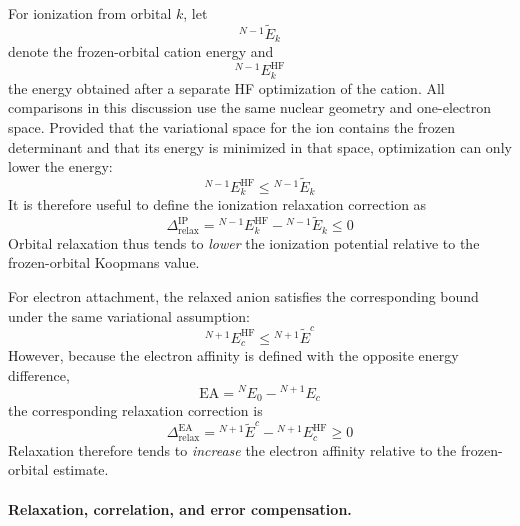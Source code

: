 \documentclass[11pt,a4paper,titlepage]{article}
\numberwithin{equation}{section}
\begin{document}
For ionization from orbital $k$, let
\begin{equation}
  {}^{N-1}\widetilde{E}_k
\end{equation}
denote the frozen-orbital cation energy and
\begin{equation}
  {}^{N-1}E_k^\text{HF}
\end{equation}
the energy obtained after a separate HF optimization of the cation.
All comparisons in this discussion use the same nuclear geometry and
one-electron space. Provided that the variational space for the ion contains
the frozen determinant and that its energy is minimized in that space,
optimization can only lower the energy:
\begin{equation}
  {}^{N-1}E_k^\text{HF}
  \leq
  {}^{N-1}\widetilde{E}_k
\end{equation}
It is therefore useful to define the ionization relaxation correction as
\begin{equation}
  \Delta_\text{relax}^\text{IP}
  =
  {}^{N-1}E_k^\text{HF}
  -
  {}^{N-1}\widetilde{E}_k
  \leq0
\end{equation}
Orbital relaxation thus tends to \emph{lower} the ionization potential
relative to the frozen-orbital Koopmans value.

For electron attachment, the relaxed anion satisfies the corresponding bound
under the same variational assumption:
\begin{equation}
  {}^{N+1}E_c^\text{HF}
  \leq
  {}^{N+1}\widetilde{E}^{c}
\end{equation}
However, because the electron affinity is defined with the opposite energy
difference,
\begin{equation}
  \text{EA}
  =
  {}^N E_0
  -
  {}^{N+1}E_c
\end{equation}
the corresponding relaxation correction is
\begin{equation}
  \Delta_\text{relax}^\text{EA}
  =
  {}^{N+1}\widetilde{E}^{c}
  -
  {}^{N+1}E_c^\text{HF}
  \geq0
\end{equation}
Relaxation therefore tends to \emph{increase} the electron affinity
relative to the frozen-orbital estimate.


\paragraph{Relaxation, correlation, and error compensation.}
\end{document}
